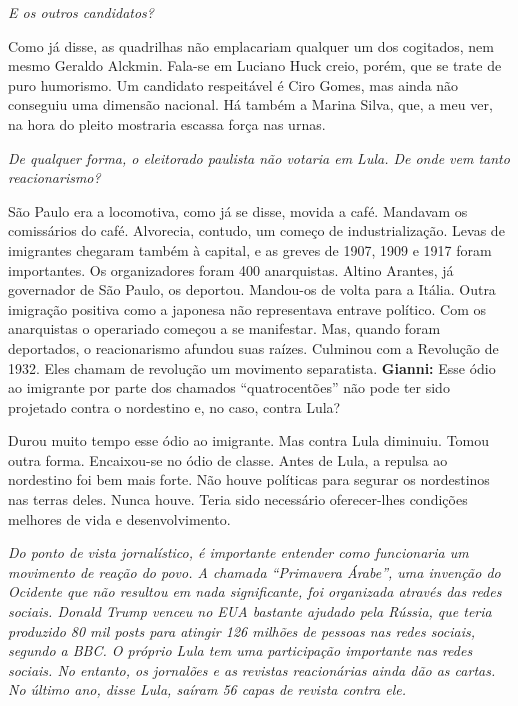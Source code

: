 \itshape
 E os outros candidatos?

\normalfont 
Como já disse, as quadrilhas não emplacariam qualquer um
dos cogitados, nem mesmo Geraldo Alckmin. Fala-se em Luciano Huck creio,
porém, que se trate de puro humorismo. Um candidato respeitável é Ciro
Gomes, mas ainda não conseguiu uma dimensão nacional. Há também a Marina
Silva, que, a meu ver, na hora do pleito mostraria escassa força nas
urnas.

\itshape
 De qualquer forma, o eleitorado paulista não votaria em
Lula. De onde vem tanto reacionarismo?

\normalfont 
São Paulo era a locomotiva, como já se disse, movida a
café. Mandavam os comissários do café. Alvorecia, contudo, um começo de
industrialização. Levas de imigrantes chegaram também à capital, e as
greves de 1907, 1909 e 1917 foram importantes. Os organizadores foram
400 anarquistas. Altino Arantes, já governador de São Paulo, os
deportou. Mandou-os de volta para a Itália. Outra imigração positiva
como a japonesa não representava entrave político. Com os anarquistas o
operariado começou a se manifestar. Mas, quando foram deportados, o
reacionarismo afundou suas raízes. Culminou com a Revolução de 1932.
Eles chamam de revolução um movimento separatista. \textbf{Gianni:} Esse
ódio ao imigrante por parte dos chamados ``quatrocentões'' não pode ter
sido projetado contra o nordestino e, no caso, contra Lula?

\normalfont 
Durou muito tempo esse ódio ao imigrante. Mas contra Lula
diminuiu. Tomou outra forma. Encaixou-se no ódio de classe. Antes de
Lula, a repulsa ao nordestino foi bem mais forte. Não houve políticas
para segurar os nordestinos nas terras deles. Nunca houve. Teria sido
necessário oferecer-lhes condições melhores de vida e desenvolvimento.

\itshape
 Do ponto de vista jornalístico, é importante entender
como funcionaria um movimento de reação do povo. A chamada ``Primavera
Árabe'', uma invenção do Ocidente que não resultou em nada significante,
foi organizada através das redes sociais. Donald Trump venceu no EUA
bastante ajudado pela Rússia, que teria produzido 80 mil \emph{posts}
para atingir 126 milhões de pessoas nas redes sociais, segundo a BBC. O
próprio Lula tem uma participação importante nas redes sociais. No
entanto, os jornalões e as revistas reacionárias ainda dão as cartas. No
último ano, disse Lula, saíram 56 capas de revista contra ele.

